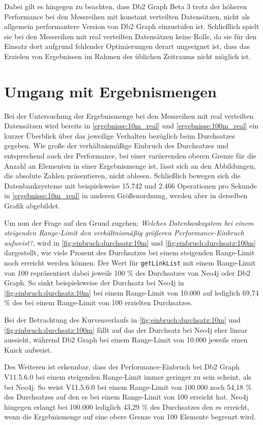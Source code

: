 Dabei gilt es hingegen zu beachten, dass Db2 Graph Beta 3 trotz der höheren Performance bei den Messreihen mit konstant verteilten Datensätzen, nicht als allgemein performantere Version von Db2 Graph einzustufen ist. Schließlich spielt sie bei den Messreihen mit real verteilten Datensätzen keine Rolle, da sie für den Einsatz dort aufgrund fehlender Optimierungen derart ungeeignet ist, dass das Erzielen von Ergebnissen im Rahmen des üblichen Zeitraums nicht möglich ist.

\section{Umgang mit Ergebnismengen}
\label{auswertung:ergebnismenge}
Bei der Untersuchung der Ergebnismenge bei den Messreihen mit real verteilten Datensätzen wird bereits in \autoref{ergebnisse:10m_real} und \autoref{ergebnisse:100m_real} ein kurzer Überblick über das jeweilige Verhalten bezüglich beim Durchsatzes gegeben. Wie große der verhältnismäßige Einbruch des Durchsatzes und entsprechend auch der Performance, bei einer variierenden oberen Grenze für die Anzahl an Elementen in einer Ergebnismenge ist, lässt sich an den Abbildungen, die absolute Zahlen präsentieren, nicht ablesen. Schließlich bewegen sich die Datenbanksysteme mit beispielsweise 15.742 und 2.466 Operationen pro Sekunde in \autoref{ergebnisse:10m_real} in anderen Größenordnung, werden aber in derselben Grafik abgebildet. 

Um nun der Frage auf den Grund zugehen: \textit{Welches Datenbanksystem bei einem steigenden Range-Limit den verhältnismäßig größeren Performance-Einbruch aufweist?}, wird in \autoref{fig:einbruch:durchsatz:10m} und \autoref{fig:einbruch:durchsatz:100m} dargestellt, wie viele Prozent des Durchsatzes bei einem steigenden Range-Limit noch erreicht werden können. Der Wert für \texttt{getLinkList} mit einem Range-Limit von 100 repräsentiert dabei jeweils 100 \% des Durchsatzes von Neo4j oder Db2 Graph. So sinkt beispielsweise der Durchsatz bei Neo4j in \autoref{fig:einbruch:durchsatz:10m} bei einem Range-Limit von 10.000 auf lediglich 69,74 \% des bei einem Range-Limit von 100 erzielten Durchsatzes. 

Bei der Betrachtung des Kurvenverlaufs in \autoref{fig:einbruch:durchsatz:10m} und \autoref{fig:einbruch:durchsatz:100m} fällt auf das der Durchsatz bei Neo4j eher linear aussieht, während Db2 Graph bei einem Range-Limit von 10.000 jeweils einen Knick aufweist. 

Des Weiteren ist erkennbar, dass der Performance-Einbruch bei Db2 Graph V11.5.6.0 bei einem steigenden Range-Limit immer geringer zu sein scheint, als bei Neo4j. So weist V11.5.6.0 bei einem Range-Limit von 100.000 noch 54,18 \% des Durchsatzes auf den es bei einem Range-Limit von 100 erreicht hat. Neo4j hingegen erlangt bei 100.000 lediglich 43,29 \% des Durchsatzes den es erreicht, wenn die Ergebnismenge auf eine obere Grenze von 100 Elemente begrenzt wird. 

